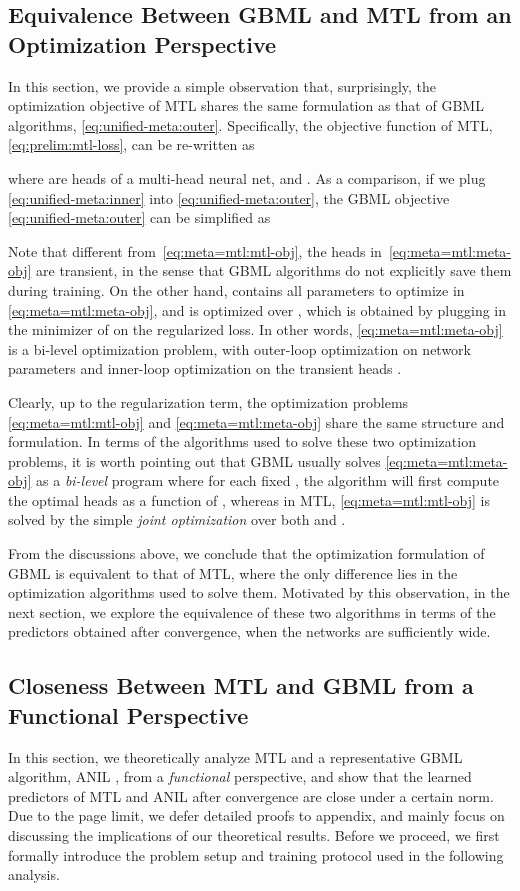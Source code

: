 \documentclass{article}
\begin{document}
\subsection{Equivalence Between GBML and MTL from an Optimization Perspective}
In this section, we provide a simple observation that, surprisingly, the optimization objective of MTL shares the same formulation as that of GBML algorithms, \eqref{eq:unified-meta:outer}. Specifically, the objective function of MTL, \eqref{eq:prelim:mtl-loss}, can be re-written as

where  are heads of a multi-head neural net, and . As a comparison, if we plug \eqref{eq:unified-meta:inner} into \eqref{eq:unified-meta:outer}, the GBML objective \eqref{eq:unified-meta:outer} can be simplified as

Note that different from~\eqref{eq:meta=mtl:mtl-obj}, the heads  in~\eqref{eq:meta=mtl:meta-obj} are transient, in the sense that GBML algorithms do not explicitly save them during training. On the other hand,  contains all parameters to optimize in \eqref{eq:meta=mtl:meta-obj}, and  is optimized over , which is obtained by plugging in the minimizer of  on the regularized loss. In other words, \eqref{eq:meta=mtl:meta-obj} is a bi-level optimization problem, with outer-loop optimization on network parameters  and inner-loop optimization on the transient heads .

Clearly, up to the regularization term, the optimization problems \eqref{eq:meta=mtl:mtl-obj} and \eqref{eq:meta=mtl:meta-obj} share the same structure and formulation. In terms of the algorithms used to solve these two optimization problems, it is worth pointing out that GBML usually solves \eqref{eq:meta=mtl:meta-obj} as a \textit{bi-level} program where for each fixed , the algorithm will first compute the optimal heads  as a function of , whereas in MTL,  \eqref{eq:meta=mtl:mtl-obj} is solved by the simple \textit{joint optimization} over both  and .

From the discussions above, we conclude that the optimization formulation of GBML is equivalent to that of MTL, where the only difference lies in the optimization algorithms used to solve them. Motivated by this observation, in the next section, we explore the equivalence of these two algorithms in terms of the predictors obtained after convergence, when the networks are sufficiently wide. 

\subsection{Closeness Between MTL and GBML from a Functional Perspective}\label{sec:mtl=meta:functional}
In this section, we theoretically analyze MTL and a representative GBML algorithm, ANIL \cite{raghu2019rapid}, from a \textit{functional} perspective, and show that the learned predictors of MTL and ANIL after convergence are close under a certain norm. Due to the page limit, we defer detailed proofs to appendix, and mainly focus on discussing the implications of our theoretical results. Before we proceed, we first formally introduce the problem setup and training protocol used in the following analysis.
\end{document}
